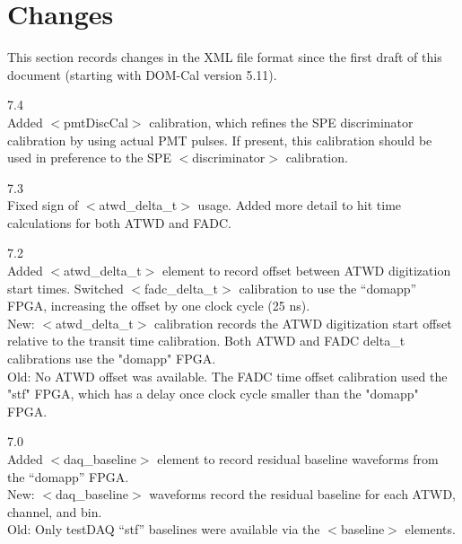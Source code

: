 \documentclass[10pt]{article}
\begin{document}

\section{Changes}

This section records changes in the XML file format since the first draft
of this document (starting with DOM-Cal version 5.11).

\bi

\item{7.4}\\
  Added $<$pmtDiscCal$>$ calibration, which refines the SPE discriminator
  calibration by using actual PMT pulses.  If present, this calibration
  should be used in preference to the SPE $<$discriminator$>$ calibration.  \\

\item{7.3}\\
  Fixed sign of $<$atwd\_delta\_t$>$ usage.  Added more detail to hit time
  calculations for both ATWD and FADC.\\

\item{7.2}\\
  Added $<$atwd\_delta\_t$>$ element to record offset between ATWD digitization
  start times.  Switched $<$fadc\_delta\_t$>$ calibration to use the
  ``domapp'' FPGA, increasing the offset by one clock cycle (25 ns).\\
  New: $<$atwd\_delta\_t$>$ calibration records the ATWD digitization start offset
  relative to the transit time calibration.  Both ATWD and FADC delta\_t calibrations use
  the "domapp" FPGA.\\
  Old: No ATWD offset was available.  The FADC time offset calibration used the "stf" FPGA, which 
  has a delay once clock cycle smaller than the "domapp" FPGA.\\ 

\item{7.0}\\
  Added $<$daq\_baseline$>$ element to record residual baseline waveforms
  from the ``domapp'' FPGA.\\
  New: $<$daq\_baseline$>$ waveforms record the residual baseline for each
  ATWD, channel, and bin.\\
  Old: Only testDAQ ``stf'' baselines were available via the $<$baseline$>$
  elements.\\ 
\end{document}
